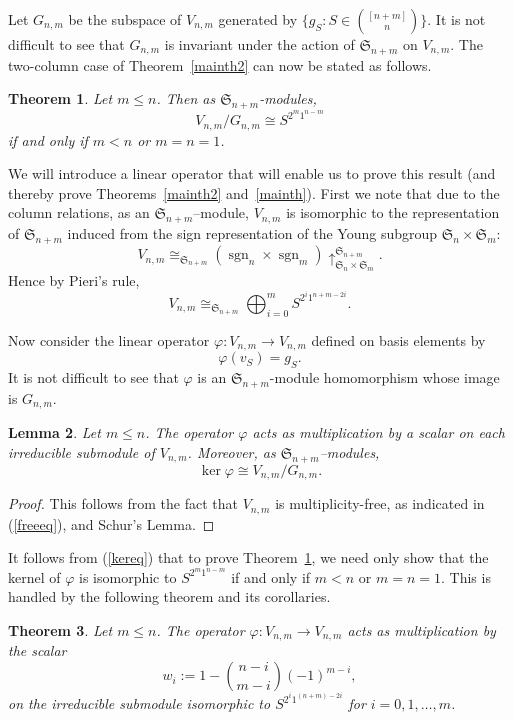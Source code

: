 \documentclass[12pt]{amsart}
\numberwithin{equation}{section}
\DeclareMathOperator{\sgn}{sgn}
\newcommand{\be}{\begin{equation}}
\newcommand{\ee}{\end{equation}}
\def\sg{\mathfrak S}
\newtheorem{theorem}{Theorem}[section]
\newtheorem{lemma}[theorem]{Lemma}
\begin{document}
Let $G_{n,m}$ be the subspace of $V_{n,m}$ generated by $\{g_S : S \in \binom{[n+m]} n\}$.  It is not difficult to see that $G_{n,m}$ is invariant under the action of $\sg_{n+m}$ on $V_{n,m}$. The two-column case of  Theorem~\ref{mainth2} can now be stated as follows.
\begin{theorem} \label{twocolth} Let $m \le n$. Then  as $\sg_{n+m}$-modules,
$$V_{n,m}/G_{n,m} \cong S^{2^m1^{n-m}}$$ if and only if $m <n$ or $m=n=1$.
\end{theorem} 
We will  introduce a linear operator that will enable us to prove this result (and thereby prove  Theorems~\ref{mainth2} and~\ref{mainth}).  First we note that
due to the column relations, as  an $\sg_{n+m}$--module, $V_{n,m}$ is isomorphic to the representation of $\sg_{n+m}$ induced from the sign representation of the Young subgroup $\sg_n \times \sg_m$:
\[ V_{n,m} \cong_{\sg_{n+m}}  (\sgn_n \times \sgn_{m} ) \uparrow _{\sg_n \times \sg_{m}}^{\sg_{n+m}}.  \]  
Hence by  Pieri's rule,
\begin{equation} \label{freeeq} V_{n,m} \cong_{\sg_{n+m}} \bigoplus _{i=0}^{m} S^{2^i1^{n+m-2i}}.\end{equation}

  Now consider the linear operator $\varphi: V_{n,m} \to V_{n,m}$ defined on  basis elements by
$$\varphi(v_S) = g_S.$$  It is not difficult to see that $\varphi$ is an $\sg_{n+m}$-module homomorphism whose image is $G_{n,m}$.  



 \begin{lemma} \label{decomplem} Let $m \le n$.
The operator $\varphi$ acts as multiplication by a scalar on each irreducible submodule of $V_{n,m}$.
Moreover, as  $\sg_{n+m}$--modules, \begin{equation} \label{kereq} \ker \varphi \cong V_{n,m} / G_{n,m}. \end{equation}
\end{lemma}
\begin{proof} 
This follows from the fact that $V_{n,m}$ is multiplicity-free, as indicated in  (\ref{freeeq}), and Schur's Lemma.
\end{proof}

It follows from (\ref{kereq}) that to prove Theorem~\ref{twocolth}, we need only show that the kernel of $\varphi$ is isomorphic to $S^{2^m1^{n-m}}$ if and only if $m <n$  or $m=n=1$.  This is handled by the following theorem and its corollaries. 

\begin{theorem} \label{eigens} Let $m \le n$.
The operator $\varphi:V_{n,m} \to V_{n,m}$ acts as multiplication by the scalar 
\be \label{dneqn} w _i := 1-{n-i \choose m-i}(-1)^{m-i},\ee
on the irreducible submodule  isomorphic to $S^{2^i1^{(n+m)-2i}}$ for $i=0,1,\dots,m$.
\end{theorem}
\end{document}

